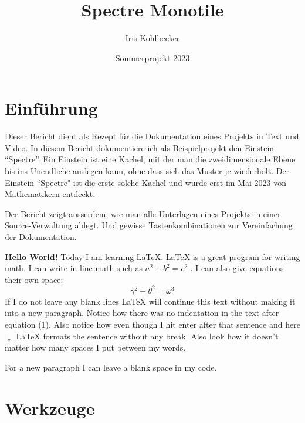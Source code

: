 \documentclass[a4paper]{article} %
\title{Spectre Monotile} %
\author{Iris Kohlbecker} %
\date{Sommerprojekt 2023} %
\begin{document}
    \maketitle %
    
    \section{Einführung} %

    Dieser Bericht dient als Rezept für die Dokumentation eines Projekts
    in Text und Video.
    In diesem Bericht dokumentiere ich als Beispielprojekt den Einstein ``Spectre''.
    Ein Einstein ist eine Kachel, mit der man die zweidimensionale Ebene bis ins 
    Unendliche auslegen kann, ohne dass sich das Muster je wiederholt.
    Der Einstein ``Spectre" ist die erste solche Kachel und wurde erst im Mai 2023
    von Mathematikern entdeckt.

    Der Bericht zeigt ausserdem, wie man alle Unterlagen eines Projekts
    in einer Source-Verwaltung ablegt.
    Und gewisse Tastenkombinationen zur Vereinfachung der Dokumentation.
    
    \textbf{Hello World!} Today I am learning \LaTeX. %
     \LaTeX{} is a great program for writing math. I can write in line math such as $a^2+b^2=c^2$ %
     . I can also give equations their own space: 
    \begin{equation} %
    \gamma^2+\theta^2=\omega^3
    \end{equation}
    If I do not leave any blank lines \LaTeX{} will continue  this text without making it into a new paragraph.  Notice how there was no indentation in the text after equation (1).  
    Also notice how even though I hit enter after that sentence and here $\downarrow$
     \LaTeX{} formats the sentence without any break.  Also   look  how      it   doesn't     matter          how    many  spaces     I put     between       my    words.
    
    For a new paragraph I can leave a blank space in my code.

    \section{Werkzeuge} %
\end{document}

